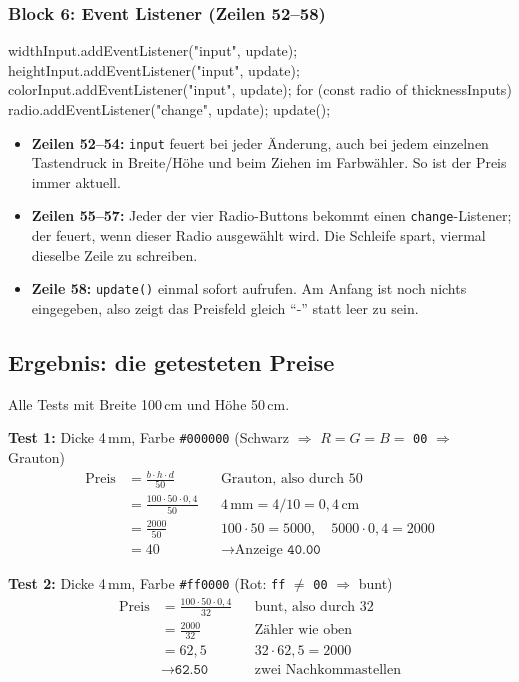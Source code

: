 \documentclass[a4paper,11pt]{article}
\begin{document}
\subsubsection*{Block 6: Event Listener (Zeilen 52--58)}
\begin{code}[firstnumber=52]
widthInput.addEventListener("input", update);
heightInput.addEventListener("input", update);
colorInput.addEventListener("input", update);
for (const radio of thicknessInputs) {
    radio.addEventListener("change", update);
}
update();
\end{code}
\begin{itemize}
\item \textbf{Zeilen 52--54:} \texttt{input} feuert bei jeder Änderung, auch bei jedem einzelnen Tastendruck in
      Breite/Höhe und beim Ziehen im Farbwähler. So ist der Preis immer aktuell.
\item \textbf{Zeilen 55--57:} Jeder der vier Radio-Buttons bekommt einen \texttt{change}-Listener; der feuert, wenn
      dieser Radio ausgewählt wird. Die Schleife spart, viermal dieselbe Zeile zu schreiben.
\item \textbf{Zeile 58:} \texttt{update()} einmal sofort aufrufen. Am Anfang ist noch nichts eingegeben, also zeigt
      das Preisfeld gleich "`-"' statt leer zu sein.
\end{itemize}

\subsection{Ergebnis: die getesteten Preise}

Alle Tests mit Breite 100\,cm und Höhe 50\,cm.

\textbf{Test 1:} Dicke 4\,mm, Farbe \texttt{\#000000} (Schwarz $\Rightarrow$ $R=G=B=$ \texttt{00} $\Rightarrow$ Grauton)
\begin{align*}
\text{Preis} &= \frac{b \cdot h \cdot d}{50} && \text{Grauton, also durch 50}\\
&= \frac{100 \cdot 50 \cdot 0{,}4}{50} && 4\,\text{mm} = 4/10 = 0{,}4\,\text{cm}\\
&= \frac{2000}{50} && 100\cdot 50 = 5000,\quad 5000 \cdot 0{,}4 = 2000\\
&= 40 && \to \text{Anzeige } \texttt{40.00}
\end{align*}

\textbf{Test 2:} Dicke 4\,mm, Farbe \texttt{\#ff0000} (Rot: \texttt{ff} $\neq$ \texttt{00} $\Rightarrow$ bunt)
\begin{align*}
\text{Preis} &= \frac{100 \cdot 50 \cdot 0{,}4}{32} && \text{bunt, also durch 32}\\
&= \frac{2000}{32} && \text{Zähler wie oben}\\
&= 62{,}5 && 32 \cdot 62{,}5 = 2000\\
&\to \texttt{62.50} && \text{zwei Nachkommastellen}
\end{align*}
\end{document}
